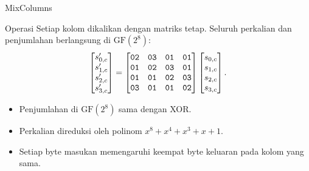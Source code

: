\documentclass[aspectratio=169,11pt]{beamer}
\begin{document}
\begin{frame}{MixColumns}
    \footnotesize
    \begin{block}{Operasi}
        Setiap kolom dikalikan dengan matriks tetap. Seluruh perkalian dan
        penjumlahan berlangsung di $\text{GF}(2^8)$:
        \[
        \begin{bmatrix}
            s'_{0,c} \\ s'_{1,c} \\ s'_{2,c} \\ s'_{3,c}
        \end{bmatrix}
        =
        \begin{bmatrix}
            \texttt{02} & \texttt{03} & \texttt{01} & \texttt{01} \\
            \texttt{01} & \texttt{02} & \texttt{03} & \texttt{01} \\
            \texttt{01} & \texttt{01} & \texttt{02} & \texttt{03} \\
            \texttt{03} & \texttt{01} & \texttt{01} & \texttt{02}
        \end{bmatrix}
        \begin{bmatrix}
            s_{0,c} \\ s_{1,c} \\ s_{2,c} \\ s_{3,c}
        \end{bmatrix}.
        \]
    \end{block}
    \vspace{0.05cm}
    \begin{itemize}
        \item Penjumlahan di $\text{GF}(2^8)$ sama dengan XOR.
        \item Perkalian direduksi oleh polinom
              $x^8 + x^4 + x^3 + x + 1$.
        \item Setiap byte masukan memengaruhi keempat byte keluaran pada
              kolom yang sama.
    \end{itemize}
\end{frame}
\end{document}
